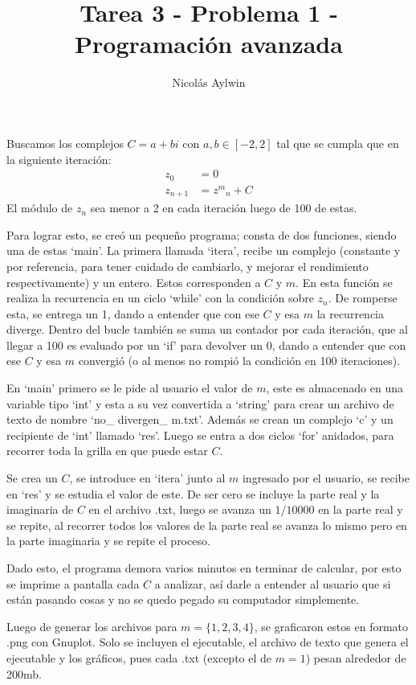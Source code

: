 \documentclass[12pt]{article}
\title{Tarea 3 - Problema 1 - Programación avanzada}
\author{Nicolás Aylwin}
\date{}
\begin{document}
\maketitle
Buscamos los complejos $C=a+bi$ con $a, b \in [-2,2]$ tal que se cumpla que en la siguiente iteración:
\begin{align*}
z_0&=0\\
z_{n+1}&={z^{m}}_n+C
\end{align*}
El módulo de $z_n$ sea menor a 2 en cada iteración luego de 100 de estas.

Para lograr esto, se creó un pequeño programa; consta de dos funciones, siendo una de estas `main'. La primera llamada `itera', recibe un complejo (constante y por referencia, para tener cuidado de cambiarlo, y mejorar el rendimiento respectivamente) y un entero. Estos corresponden a $C$ y $m$. En esta función se realiza la recurrencia en un ciclo `while' con la condición sobre $z_n$. De romperse esta, se entrega un 1, dando a entender que con ese $C$ y esa $m$ la recurrencia diverge. Dentro del bucle también se suma un contador por cada iteración, que al llegar a 100 es evaluado por un `if' para devolver un 0, dando a entender que con ese $C$ y esa $m$ convergió (o al menos no rompió la condición en 100 iteraciones).  

En `main' primero se le pide al usuario el valor de $m$, este es almacenado en una variable tipo `int' y esta a su vez convertida a `string' para crear un archivo de texto de nombre `no\_ divergen\_ m.txt'. Además se crean un complejo `c' y un recipiente de `int' llamado `res'. Luego se entra a dos ciclos `for' anidados, para recorrer toda la grilla en que puede estar $C$. 

Se crea un $C$, se introduce en `itera' junto al $m$ ingresado por el usuario, se recibe en `res' y se estudia el valor de este. De ser cero se incluye la parte real y la imaginaria de $C$ en el archivo .txt, luego se avanza un $1/10000$ en la parte real y se repite, al recorrer todos los valores de la parte real se avanza lo mismo pero en la parte imaginaria y se repite el proceso. 

Dado esto, el programa demora varios minutos en terminar de calcular, por esto se imprime a pantalla cada $C$ a analizar, así darle a entender al usuario que si están pasando cosas y no se quedo pegado su computador simplemente.

Luego de generar los archivos para $m=\{1,2,3,4\}$, se graficaron estos en formato .png con Gnuplot. Solo se incluyen el ejecutable, el archivo de texto que genera el ejecutable y los gráficos, pues cada .txt (excepto el de $m=1$) pesan alrededor de 200mb.
\end{document}
